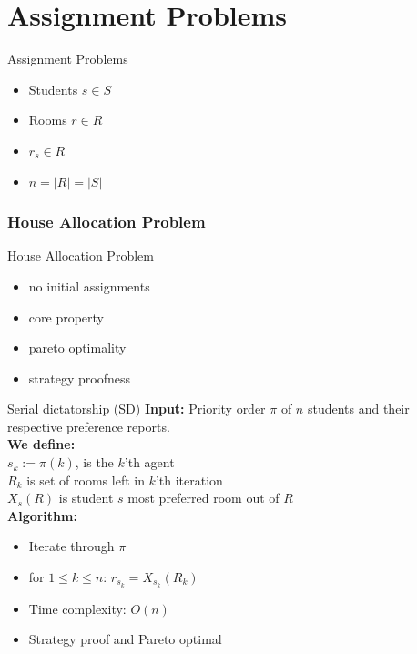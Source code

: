 \section{Assignment Problems}

\begin{frame}{Assignment Problems}
    \begin{itemize}[<+->]
        \item Students $s \in S$
        \item Rooms $r \in R$
        \item $r_s \in R$
        \item $n = |R| = |S|$
    \end{itemize}
\end{frame}

\subsubsection{House Allocation Problem}

\begin{frame}{House Allocation Problem}
\begin{itemize}[<+->]
    \item no initial assignments
    \item core property %
    \item pareto optimality 
    \item strategy proofness
\end{itemize}    
\end{frame}

\begin{frame}{Serial dictatorship (SD)}
    \textbf{Input:} Priority order $\pi$ of $n$ students and their respective preference reports. \\
    \textbf{We define:} \\
    $s_k := \pi(k)$, is the $k$'th agent \\
    $R_k$ is set of rooms left in $k$'th iteration \\
    $X_s(R)$ is student $s$ most preferred room out of $R$ \\
    \textbf{Algorithm:} 
    \begin{itemize}
    \item Iterate through $\pi$
    \item for $1 \leq k \leq n$: $r_{s_k} = X_{s_k}(R_k)$
    \end{itemize} 
    \begin{itemize}[<+->]
        \item Time complexity: $O(n)$
        \item Strategy proof and Pareto optimal
    \end{itemize}
\end{frame}

